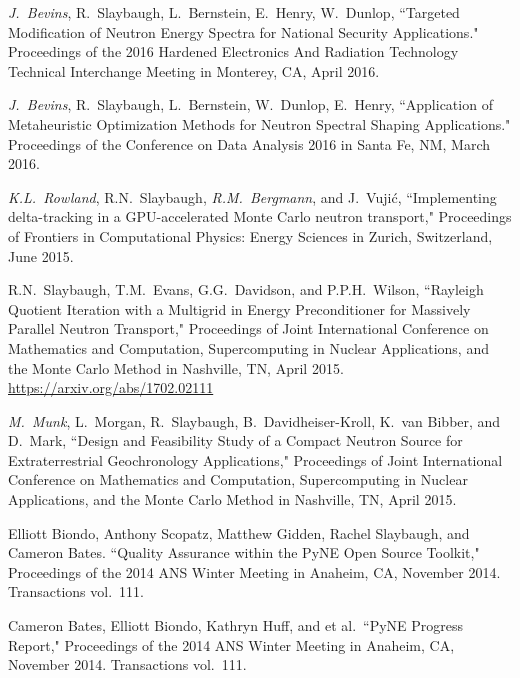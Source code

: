 \begin{bibsection}
\item \textit{J.\ Bevins}, R.\ Slaybaugh, L.\ Bernstein, E.\ Henry, W.\ Dunlop, ``Targeted Modification of Neutron Energy Spectra for National Security Applications." Proceedings of the 2016 Hardened Electronics And Radiation Technology Technical Interchange Meeting in Monterey, CA, April 2016. 

\item \textit{J.\ Bevins}, R.\ Slaybaugh, L.\ Bernstein, W.\ Dunlop, E.\ Henry, ``Application of Metaheuristic Optimization Methods for Neutron Spectral Shaping Applications." Proceedings of the Conference on Data Analysis 2016 in Santa Fe, NM, March 2016. 

\item \textit{K.L.\ Rowland}, R.N.\ Slaybaugh, \textit{R.M.\ Bergmann}, and J.\ Vuji\'c, ``Implementing delta-tracking in a GPU-accelerated Monte Carlo neutron transport," Proceedings of Frontiers in Computational Physics: Energy Sciences in Zurich, Switzerland, June 2015. 

\item  R.N.\ Slaybaugh, T.M.\ Evans, G.G.\ Davidson, and P.P.H.\ Wilson, ``Rayleigh Quotient Iteration with a Multigrid in Energy Preconditioner for Massively Parallel Neutron Transport," Proceedings of Joint International Conference on Mathematics and Computation, Supercomputing in Nuclear Applications, and the Monte Carlo Method in Nashville, TN, April 2015.\\
\url{https://arxiv.org/abs/1702.02111}

\item  \textit{M.\ Munk}, L.\ Morgan, R.\ Slaybaugh, B.\ Davidheiser-Kroll, K.\ van Bibber, and D.\ Mark, ``Design and Feasibility Study of a Compact Neutron Source for Extraterrestrial Geochronology Applications," Proceedings of Joint International Conference on Mathematics and Computation, Supercomputing in Nuclear Applications, and the Monte Carlo Method in Nashville, TN, April 2015.

\item Elliott Biondo, Anthony Scopatz, Matthew Gidden, Rachel Slaybaugh, and Cameron Bates. ``Quality Assurance within the PyNE Open Source Toolkit,"  Proceedings of the 2014 ANS Winter Meeting in Anaheim, CA, November 2014. Transactions vol.\ 111.

\item Cameron Bates, Elliott Biondo, Kathryn Huff, and et al.\ ``PyNE Progress Report," Proceedings of the 2014 ANS Winter Meeting in Anaheim, CA, November 2014. Transactions vol.\ 111.


\end{bibsection}
